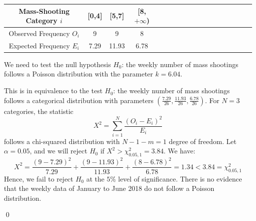 \documentclass[12pt]{article}
\begin{document}
\begin{center}
\begin{tabular}{|c|c|c|c|c|c|c|c|c|c|c|c|c|c|c|c|c|c|}
\hline
Mass-Shooting Category $i$ & [0,4] & [5,7] & [8,$+\infty$) \\ \hline
Observed Frequency $O_i$ & 9 & 9 & 8 \\ \hline
Expected Frequency $E_i$ & 7.29 & 11.93 & 6.78 \\ \hline
\end{tabular}
\end{center}
\par We need to test the null hypothesis
$H_0$: the weekly number of mass shootings follows a Poisson distribution with the parameter $k=6.04$.
\par This is in equivalence to the test $H_0$: the weekly number of mass shootings follows a categorical distribution with parameters $(\frac{7.29}{26},\frac{11.93}{26},\frac{6.78}{26})$.
For $N=3$ categories, the statistic
\begin{equation*}
X^2=\sum_{i=1}^{N}\frac{(O_i-E_i)^2}{E_i}
\end{equation*}
follows a chi-squared distribution with $N-1-m=1$ degree of freedom. Let $\alpha=0.05$, and we will reject $H_0$ if $X^2>\chi^2_{0.05,1}=3.84$. We have:
\begin{equation*}
X^2=\frac{(9-7.29)^2}{7.29}+\frac{(9-11.93)^2}{11.93}+\frac{(8-6.78)^2}{6.78}=1.34<3.84=\chi^2_{0.05,1}
\end{equation*}
Hence, we fail to reject $H_0$ at the $5\%$ level of significance. There is no evidence that the weekly data of January to June 2018 do not follow a Poisson distribution.
\par \qed
\end{document}
